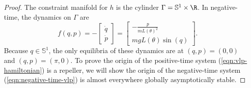 \begin{proof}
   The constraint manifold for \(h\) is the cylinder \(\Gamma = \mathbb{S}^1 \times \R \). 
   In negative-time, the dynamics on \(\Gamma\) are
   \begin{equation}\label{eqn:negative-time-vlp}
      f(q,p) = 
      -\begin{bmatrix}
         \dot{q} \\ \dot{p}
      \end{bmatrix} = \begin{bmatrix}
         -\frac{p}{mL(\theta)^2} \\
         mgL(\theta)\sin(q)
      \end{bmatrix}
      .
   \end{equation}
   Because \(q \in \mathbb{S}^1\), the only equilibria of these dynamics are 
   at \((q,p) = (0,0)\) and \((q,p) = (\pi,0)\).
   To prove the origin of the positive-time system (\ref{eqn:vlp-hamiltonian})
   is a repeller, we will show the origin of the negative-time system 
   (\ref{eqn:negative-time-vlp}) is almost everywhere globally asymptotically
   stable. 


\end{proof}
